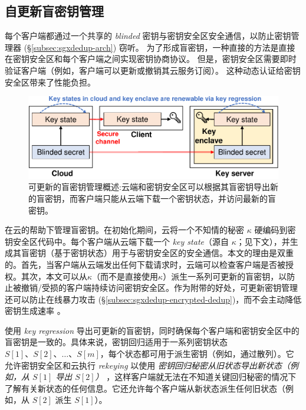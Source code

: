 \subsection{自更新盲密钥管理}
\label{subsec:sgxdedup-key-management}

每个客户端都通过一个共享的 \textit{ blinded} 密钥与密钥安全区安全通信，以防止密钥管理器 (\S\ref{subsec:sgxdedup-arch}) 窃听。 为了形成盲密钥，一种直接的方法是直接在密钥安全区和每个客户端之间实现密钥协商协议。 但是，密钥安全区需要即时验证客户端（例如，客户端可以更新或撤销其云服务订阅）。 这种动态认证给密钥安全区带来了性能负担。


\begin{figure}[t]
\centering
\includegraphics[width=\textwidth]{pic/sgxdedup/blindkey.pdf}
\vspace{-16pt}
\caption{可更新的盲密钥管理概述:云端和密钥安全区可以根据其盲密钥导出新的盲密钥，而客户端只能从云端下载一个密钥状态，并访问最新的盲密钥。}
\label{fig:sgxdedup-keymanage}
\end{figure}

\sysnameS 在云的帮助下管理盲密钥。在初始化期间，云将一个不知情的秘密 $\kappa$ 硬编码到密钥安全区代码中。每个客户端从云端下载一个 \textit{ key state}（源自 $\kappa$；见下文），并生成其盲密钥（基于密钥状态）用于与密钥安全区的安全通信。本文的理由是双重的。首先，当客户端从云端发出任何下载请求时，云端可以检查客户端是否被授权。其次，本文可以从$\kappa$（而不是直接使用$\kappa$）派生一系列可更新的盲密钥，以防止被撤销/受损的客户端持续访问密钥安全区。作为附带的好处，可更新密钥管理还可以防止在线暴力攻击 (\S\ref{subsec:sgxdedup-encrypted-dedup})，而不会主动降低密钥生成速率 \cite{bellare2013DupLESS}。

\sysnameS 使用 \textit{ key regression} \cite{fu06} 导出可更新的盲密钥，同时确保每个客户端和密钥安全区中的盲密钥是一致的。具体来说，密钥回归适用于一系列密钥状态 $S[1]、S[2]、\ldots、S[m]$，每个状态都可用于派生密钥（例如，通过散列）。它允许密钥安全区和云执行 \textit{ rekeying} 以使用 \textit{ 密钥回归秘密从旧状态导出新状态（例如，从 $S[1]$ 导出 $S[2]$） }，这样客户端就无法在不知道关键回归秘密的情况下了解有关新状态的任何信息。它还允许每个客户端从新状态派生任何旧状态（例如，从 $S[2]$ 派生 $S[1]$）。

